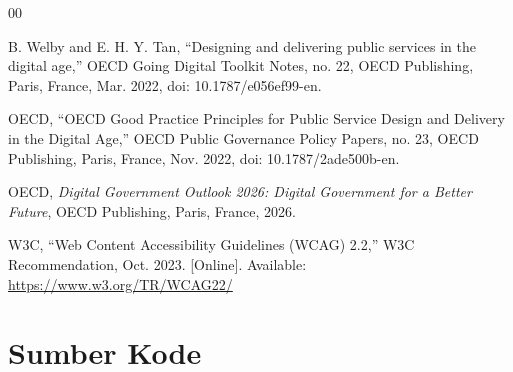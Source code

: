 \documentclass[conference]{IEEEtran}
\begin{document}
\begin{thebibliography}{00}

B. Welby and E. H. Y. Tan,
``Designing and delivering public services in the digital age,''
OECD Going Digital Toolkit Notes, no. 22,
OECD Publishing, Paris, France, Mar. 2022,
doi: 10.1787/e056ef99-en.

OECD,
``OECD Good Practice Principles for Public Service Design and Delivery in the Digital Age,''
OECD Public Governance Policy Papers, no. 23,
OECD Publishing, Paris, France, Nov. 2022,
doi: 10.1787/2ade500b-en.

OECD,
\textit{Digital Government Outlook 2026: Digital Government for a Better Future},
OECD Publishing, Paris, France, 2026.

W3C,
``Web Content Accessibility Guidelines (WCAG) 2.2,''
W3C Recommendation, Oct. 2023.
[Online]. Available: \url{https://www.w3.org/TR/WCAG22/}

\end{thebibliography}

\clearpage
\onecolumn
\section{Sumber Kode}
\end{document}
